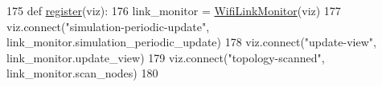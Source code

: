 \begin{DoxyCode}
175 \textcolor{keyword}{def }\hyperlink{namespacewifi__intrastructure__link_a6c3b0bc3d08a5991596d918206609e8c}{register}(viz):
176     link\_monitor = \hyperlink{classwifi__intrastructure__link_1_1WifiLinkMonitor}{WifiLinkMonitor}(viz)
177     viz.connect(\textcolor{stringliteral}{"simulation-periodic-update"}, link\_monitor.simulation\_periodic\_update)
178     viz.connect(\textcolor{stringliteral}{"update-view"}, link\_monitor.update\_view)
179     viz.connect(\textcolor{stringliteral}{"topology-scanned"}, link\_monitor.scan\_nodes)
180 \end{DoxyCode}
